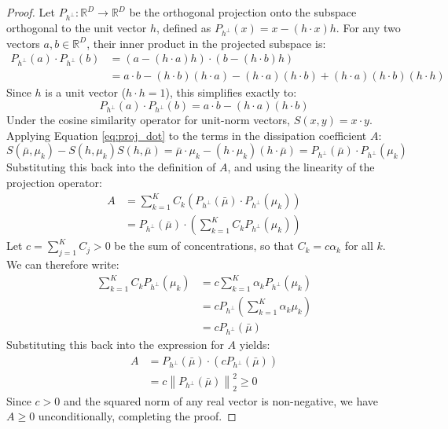 \begin{proof}
Let $P_{h^\perp}: \mathbb{R}^D \to \mathbb{R}^D$ be the orthogonal projection onto the subspace orthogonal to the unit vector $h$, defined as $P_{h^\perp}(x) = x - (h \cdot x) h$. For any two vectors $a, b \in \mathbb{R}^D$, their inner product in the projected subspace is:
\begin{align*}
P_{h^\perp}(a) \cdot P_{h^\perp}(b) &= \left( a - (h \cdot a) h \right) \cdot \left( b - (h \cdot b) h \right) \\
&= a \cdot b - (h \cdot b) (h \cdot a) - (h \cdot a) (h \cdot b) + (h \cdot a) (h \cdot b) (h \cdot h)
\end{align*}
Since $h$ is a unit vector ($h \cdot h = 1$), this simplifies exactly to:
\begin{equation}
P_{h^\perp}(a) \cdot P_{h^\perp}(b) = a \cdot b - (h \cdot a) (h \cdot b)
\label{eq:proj_dot}
\end{equation}
Under the cosine similarity operator for unit-norm vectors, $S(x, y) = x \cdot y$. Applying Equation \eqref{eq:proj_dot} to the terms in the dissipation coefficient $A$:
\begin{equation*}
S(\bar{\mu}, \mu_k) - S(h, \mu_k) S(h, \bar{\mu}) = \bar{\mu} \cdot \mu_k - (h \cdot \mu_k) (h \cdot \bar{\mu}) = P_{h^\perp}(\bar{\mu}) \cdot P_{h^\perp}(\mu_k)
\end{equation*}
Substituting this back into the definition of $A$, and using the linearity of the projection operator:
\begin{align*}
A &= \sum_{k=1}^K C_k \left( P_{h^\perp}(\bar{\mu}) \cdot P_{h^\perp}(\mu_k) \right) \\
&= P_{h^\perp}(\bar{\mu}) \cdot \left( \sum_{k=1}^K C_k P_{h^\perp}(\mu_k) \right)
\end{align*}
Let $c = \sum_{j=1}^K C_j > 0$ be the sum of concentrations, so that $C_k = c \alpha_k$ for all $k$. We can therefore write:
\begin{align*}
\sum_{k=1}^K C_k P_{h^\perp}(\mu_k) &= c \sum_{k=1}^K \alpha_k P_{h^\perp}(\mu_k) \\
&= c P_{h^\perp}\left( \sum_{k=1}^K \alpha_k \mu_k \right) \\
&= c P_{h^\perp}(\bar{\mu})
\end{align*}
Substituting this back into the expression for $A$ yields:
\begin{align*}
A &= P_{h^\perp}(\bar{\mu}) \cdot \left( c P_{h^\perp}(\bar{\mu}) \right) \\
&= c \left\| P_{h^\perp}(\bar{\mu}) \right\|_2^2 \ge 0
\end{align*}
Since $c > 0$ and the squared norm of any real vector is non-negative, we have $A \ge 0$ unconditionally, completing the proof.
\end{proof}

